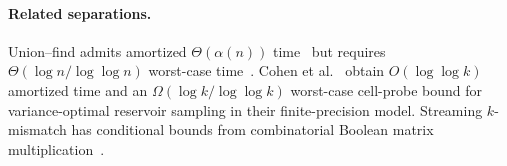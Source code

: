 \paragraph{Related separations.}
Union--find admits amortized $\Theta(\alpha(n))$ time~\cite{tarjan_efficiency_1975,fredman_cell_1989} but requires $\Theta(\log n/\log\log n)$ worst-case time~\cite{blum_single-operation_1985,fredman_cell_1989}. Cohen et al.~\cite{cohen_efficient_2011} obtain $O(\log\log k)$ amortized time and an $\Omega(\log k/\log\log k)$ worst-case cell-probe bound for variance-optimal reservoir sampling in their finite-precision model. Streaming $k$-mismatch has conditional bounds from combinatorial Boolean matrix multiplication~\cite{golan_streaming_2020,gawrychowski_towards_2018}.
